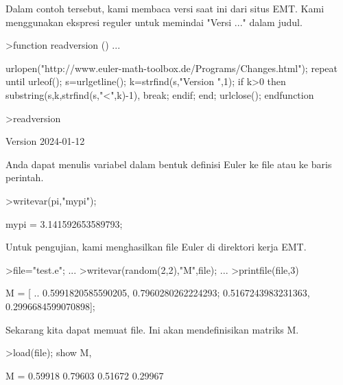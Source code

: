 \documentclass[a4paper,10pt]{article}
\begin{document}
\begin{eulernotebook}
\begin{eulercomment}
\begin{eulercomment}
\begin{eulercomment}
\begin{eulercomment}
\begin{eulercomment}
\begin{eulercomment}
\begin{eulercomment}
Dalam contoh tersebut, kami membaca versi saat ini dari situs EMT.
Kami menggunakan ekspresi reguler untuk memindai "Versi ..." dalam
judul.
\end{eulercomment}
\begin{eulerprompt}
>function readversion () ...
\end{eulerprompt}
\begin{eulerudf}
  urlopen("http://www.euler-math-toolbox.de/Programs/Changes.html");
  repeat
    until urleof();
    s=urlgetline();
    k=strfind(s,"Version ",1);
    if k>0 then substring(s,k,strfind(s,"<",k)-1), break; endif;
  end;
  urlclose();
  endfunction
\end{eulerudf}
\begin{eulerprompt}
>readversion
\end{eulerprompt}
\begin{euleroutput}
  Version 2024-01-12
\end{euleroutput}
\begin{eulercomment}
Anda dapat menulis variabel dalam bentuk definisi Euler ke file atau
ke baris perintah.
\end{eulercomment}
\begin{eulerprompt}
>writevar(pi,"mypi");
\end{eulerprompt}
\begin{euleroutput}
  mypi = 3.141592653589793;
\end{euleroutput}
\begin{eulercomment}
Untuk pengujian, kami menghasilkan file Euler di direktori kerja EMT.
\end{eulercomment}
\begin{eulerprompt}
>file="test.e"; ...
>writevar(random(2,2),"M",file); ...
>printfile(file,3)
\end{eulerprompt}
\begin{euleroutput}
  M = [ ..
  0.5991820585590205, 0.7960280262224293;
  0.5167243983231363, 0.2996684599070898];
\end{euleroutput}
\begin{eulercomment}
Sekarang kita dapat memuat file. Ini akan mendefinisikan matriks M.
\end{eulercomment}
\begin{eulerprompt}
>load(file); show M,
\end{eulerprompt}
\begin{euleroutput}
  M = 
    0.59918   0.79603 
    0.51672   0.29967 
\end{euleroutput}

\end{eulercomment}
\end{eulercomment}
\end{eulercomment}
\end{eulercomment}
\end{eulercomment}
\end{eulercomment}
\end{eulernotebook}
\end{document}
